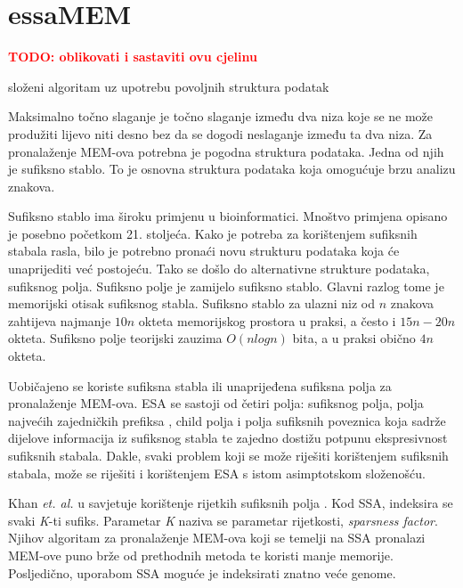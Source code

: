 \documentclass[times, utf8, seminar, numeric]{fer}
\newcommand\todo[1]{\textbf{\textcolor{red}{TODO: #1}}}
\begin{document}
\chapter{essaMEM}

\todo{oblikovati i sastaviti ovu cjelinu}

složeni algoritam uz upotrebu povoljnih struktura podatak

Maksimalno točno slaganje  je točno slaganje između dva niza koje se ne može produžiti lijevo niti desno bez da se dogodi neslaganje između ta dva niza. Za pronalaženje MEM-ova potrebna je pogodna struktura podataka. Jedna od njih je sufiksno stablo. To je osnovna struktura podataka koja omogućuje brzu analizu znakova. 

Sufiksno stablo ima široku primjenu u bioinformatici. Mnoštvo primjena opisano je posebno početkom 21. stoljeća. Kako je potreba za korištenjem sufiksnih stabala rasla, bilo je potrebno pronaći novu strukturu podataka koja će unaprijediti već postojeću. Tako se došlo do alternativne strukture podataka, sufiksnog polja. Sufiksno polje je zamijelo sufiksno stablo. Glavni razlog tome je memorijski otisak sufiksnog stabla. Sufiksno stablo za ulazni niz od $n$ znakova zahtijeva najmanje $10n$ okteta memorijskog prostora u praksi, a često i $15n-20n$ okteta. Sufiksno polje teorijski zauzima $O(n log n)$ bita, a u praksi obično $4n$ okteta.

Uobičajeno se koriste sufiksna stabla ili unaprijeđena sufiksna polja  za pronalaženje MEM-ova. ESA se sastoji od četiri polja: sufiksnog polja, polja najvećih zajedničkih prefiksa , child polja i polja sufiksnih poveznica  koja sadrže dijelove informacija iz sufiksnog stabla te zajedno dostižu potpunu ekspresivnost sufiksnih stabala. Dakle, svaki problem koji se može riješiti korištenjem sufiksnih stabala, može se riješiti i korištenjem ESA s istom asimptotskom složenošću.

Khan \textit{et. al.} u \cite{ssa} savjetuje korištenje rijetkih sufiksnih polja . Kod SSA, indeksira se svaki \textit{K}-ti sufiks. Parametar \textit{K} naziva se parametar rijetkosti, \textit{sparsness factor}. Njihov algoritam za pronalaženje MEM-ova koji se temelji na SSA pronalazi MEM-ove puno brže od prethodnih metoda te koristi manje memorije. Posljedično, uporabom SSA moguće je indeksirati znatno veće genome.
\end{document}

